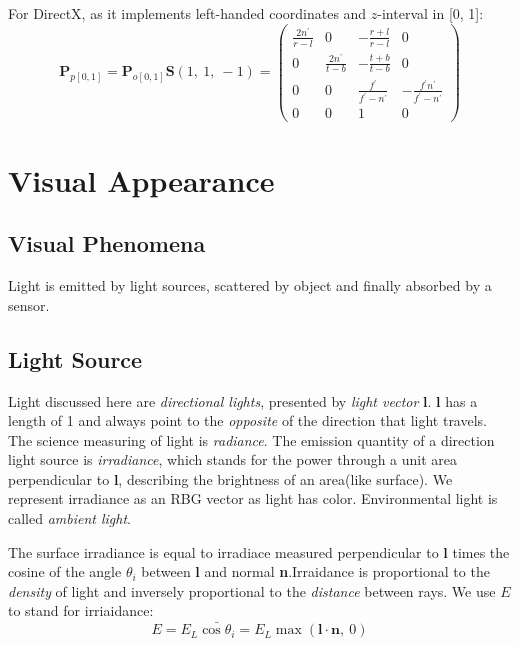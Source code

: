 \documentclass[10pt, a4paper]{article}
\begin{document}
            For DirectX, as it implements left-handed coordinates and $z$-interval in [0, 1]:
            \begin{equation*}
                \textbf{P}_{p[0,1]} = \textbf{P}_{o[0, 1]}\textbf{S}(1,\ 1,\ -1) = 
                \begin{pmatrix}
                    \frac{2n^{'}}{r - l} & 0 & -\frac{r + l}{r - l} & 0\\
                    0 & \frac{2n^{'}}{t - b} & -\frac{t + b}{t - b} & 0\\
                    0 & 0 & \frac{f^{'}}{f^{'} - n^{'}} & -\frac{f^{'}n^{'}}{f^{'} - n^{'}}\\
                    0 & 0 & 1 & 0
                \end{pmatrix}
            \end{equation*}
            \newpage

\section{Visual Appearance}
    \subsection{Visual Phenomena} 
        Light is emitted by light sources, scattered by object and finally absorbed by a sensor.
    \subsection{Light Source}
        Light discussed here are \emph{directional lights}, presented by \emph{light vector} \textbf{l}. $\textbf{l}$ has a length of 1 and always point to the \emph{opposite} of the direction that light travels. The science measuring of light is \emph{radiance}. The emission quantity of a direction light source is \emph{irradiance}, which stands for the power through a unit area perpendicular to \textbf{l}, describing the brightness of an area(like surface). We represent irradiance as an RBG vector as light has color. Environmental light is called \emph{ambient light}.
            
        The surface irradiance is equal to irradiace measured perpendicular to \textbf{l} times the cosine of the angle $\theta_i$ between \textbf{l} and normal \textbf{n}.Irraidance is proportional to the \emph{density} of light and inversely proportional to the \emph{distance} between rays. We use $E$ to stand for irriaidance:
        $$E = E_L\bar{\cos{\theta_i}} = E_L \max(\textbf{l}\cdot\textbf{n},\ 0)$$
        
\end{document}
